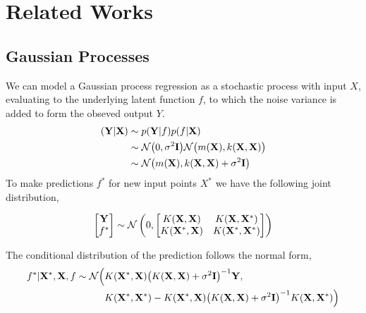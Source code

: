 \section{Related Works}
\subsection{Gaussian Processes}
We can model a Gaussian process regression as a stochastic process with input $X$, evaluating to the underlying latent function $f$, to which the noise variance is added to form the obseved output $Y$.
\begin{align*}
(\mathbf{Y}|\mathbf{X}) 	&\sim p(\mathbf{Y}|f) p(f|\mathbf{X})\\
	   		&\sim \mathcal{N}\big(0,\sigma^2\mathbf{I}\big) \mathcal{N}\big(m(\mathbf{X}),k(\mathbf{X},\mathbf{X})\big)\\
	   		&\sim  \mathcal{N}\big(m(\mathbf{X}),k(\mathbf{X},\mathbf{X})+\sigma^2\mathbf{I}\big)
\end{align*} 
To make predictions $f^*$ for new input points $X^*$ we have the following joint distribution,

\begin{align*}
\begin{bmatrix} \mathbf{Y} \\ f^* \end{bmatrix}
 \sim
 \mathcal{N}
 \begin{pmatrix}
  0,
  \begin{bmatrix}
  	K(\mathbf{X},\mathbf{X}) & K(\mathbf{X},\mathbf{X}^*)\\
  	K(\mathbf{X}^*,\mathbf{X}) & K(\mathbf{X}^*,\mathbf{X}^*)
  \end{bmatrix}
 \end{pmatrix} 
\end{align*}

The conditional distribution of the prediction follows the normal form,
\begin{align*}
f^*|\mathbf{X}^*,\mathbf{X},f \sim \mathcal{N}\Big( & K(\mathbf{X}^*,\mathbf{X})\big(K(\mathbf{X},\mathbf{X})+\sigma^2\mathbf{I}\big)^{-1}\mathbf{Y},\\
								  & K(\mathbf{X}^*,\mathbf{X}^*)-K(\mathbf{X}^*,\mathbf{X})\big(K(\mathbf{X},\mathbf{X})+\sigma^2\mathbf{I}\big)^{-1}K(\mathbf{X},\mathbf{X}^*)\Big)
\end{align*}

